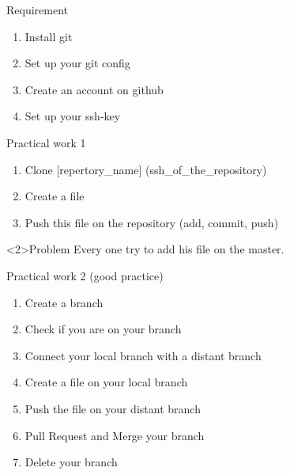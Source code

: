 % 
\begin{frame}{Requirement}
    \begin{enumerate}
        \item Install git
        \item Set up your git config
        \item Create an account on github
        \item Set up your ssh-key
    \end{enumerate}
\end{frame}

\begin{frame}{Practical work 1}
    \begin{enumerate}
        \item Clone [repertory\_name] (ssh\_of\_the\_repository)
        \item Create a file
        \item Push this file on the repository (add, commit, push)
    \end{enumerate}
    \begin{alertblock}<2>{Problem}
        Every one try to add his file on the master.
    \end{alertblock}
\end{frame}

\begin{frame}{Practical work 2 (good practice)}
    \begin{enumerate}
        \item Create a branch
        \item Check if you are on your branch
        \item Connect your local branch with a distant branch
        \item Create a file on your local branch
        \item Push the file on your distant branch
        \item Pull Request and Merge your branch
        \item Delete your branch
    \end{enumerate}
\end{frame}


